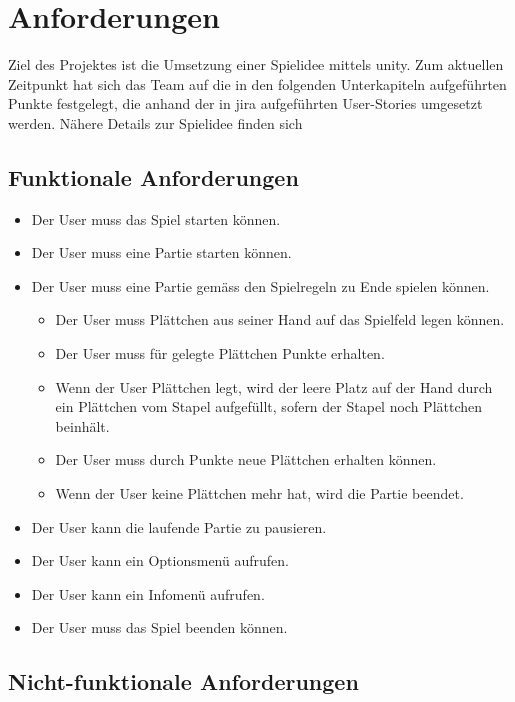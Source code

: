 \documentclass[../main.tex]{subfiles}
\begin{document}
    \section{Anforderungen}
    Ziel des Projektes ist die Umsetzung einer Spielidee mittels \gls{unity}. Zum aktuellen Zeitpunkt hat sich das Team auf die in den folgenden Unterkapiteln aufgeführten Punkte festgelegt, die anhand der in \gls{jira} aufgeführten User-Stories umgesetzt werden. Nähere Details zur Spielidee finden sich 
    \subsection{Funktionale Anforderungen}
    \begin{itemize}
    	\item Der User muss das Spiel starten können.
    	\item Der User muss eine Partie starten können.
    	\item Der User muss eine Partie gemäss den Spielregeln zu Ende spielen können.
    	\begin{itemize}
    		\item Der User muss Plättchen aus seiner Hand auf das Spielfeld legen können.
    		\item Der User muss für gelegte Plättchen Punkte erhalten.
    		\item Wenn der User Plättchen legt, wird der leere Platz auf der Hand durch ein Plättchen vom Stapel aufgefüllt, sofern der Stapel noch Plättchen beinhält.
    		\item Der User muss durch Punkte neue Plättchen erhalten können.
    		\item Wenn der User keine Plättchen mehr hat, wird die Partie beendet.
    	\end{itemize}
    	\item Der User kann die laufende Partie zu pausieren.
    	\item Der User kann ein Optionsmenü aufrufen.
    	\item Der User kann ein Infomenü aufrufen.
    	\item Der User muss das Spiel beenden können.
    \end{itemize}
	\par {}

	\subsection{Nicht-funktionale Anforderungen}
\end{document}
